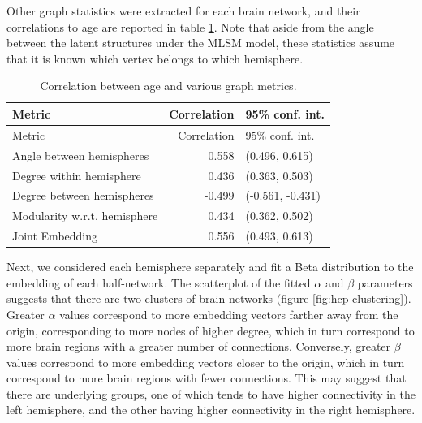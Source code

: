 \documentclass[12pt]{article}
\begin{document}
Other graph statistics were extracted for each brain network, and their
correlations to age are reported in table \ref{tab:cor-comparison}. Note
that aside from the angle between the latent structures under the MLSM
model, these statistics assume that it is known which vertex belongs to
which hemisphere.

\begin{longtable}[]{@{}lrl@{}}
\caption{Correlation between age and various graph
metrics.\label{tab:cor-comparison}}\tabularnewline
\toprule\noalign{}
Metric & Correlation & 95\% conf. int. \\
\midrule\noalign{}
\endfirsthead
\toprule\noalign{}
Metric & Correlation & 95\% conf. int. \\
\midrule\noalign{}
\endhead
\bottomrule\noalign{}
\endlastfoot
Angle between hemispheres & 0.558 & (0.496, 0.615) \\
Degree within hemisphere & 0.436 & (0.363, 0.503) \\
Degree between hemispheres & -0.499 & (-0.561, -0.431) \\
Modularity w.r.t. hemisphere & 0.434 & (0.362, 0.502) \\
Joint Embedding & 0.556 & (0.493, 0.613) \\
\end{longtable}

Next, we considered each hemisphere separately and fit a Beta
distribution to the embedding of each half-network. The scatterplot of
the fitted \(\alpha\) and \(\beta\) parameters suggests that there are
two clusters of brain networks (figure \ref{fig:hcp-clustering}).
Greater \(\alpha\) values correspond to more embedding vectors farther
away from the origin, corresponding to more nodes of higher degree,
which in turn correspond to more brain regions with a greater number of
connections. Conversely, greater \(\beta\) values correspond to more
embedding vectors closer to the origin, which in turn correspond to more
brain regions with fewer connections. This may suggest that there are
underlying groups, one of which tends to have higher connectivity in the
left hemisphere, and the other having higher connectivity in the right
hemisphere.
\end{document}
